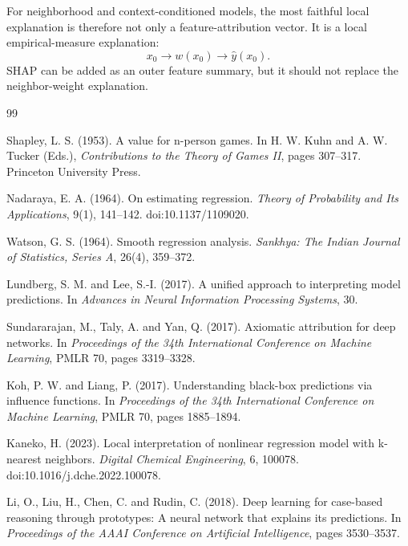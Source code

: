\documentclass[11pt]{article}
\newcommand{\1}{\mathbf{1}}
\begin{document}
For neighborhood and context-conditioned models, the most faithful local explanation is therefore not only a feature-attribution vector. It is a local empirical-measure explanation:
\[
x_0 \rightarrow w(x_0) \rightarrow \hat y(x_0).
\]
SHAP can be added as an outer feature summary, but it should not replace the neighbor-weight explanation.

\begin{thebibliography}{99}

Shapley, L. S. (1953).
\newblock A value for n-person games.
\newblock In H. W. Kuhn and A. W. Tucker (Eds.), \emph{Contributions to the Theory of Games II}, pages 307--317. Princeton University Press.

Nadaraya, E. A. (1964).
\newblock On estimating regression.
\newblock \emph{Theory of Probability and Its Applications}, 9(1), 141--142.
\newblock doi:10.1137/1109020.

Watson, G. S. (1964).
\newblock Smooth regression analysis.
\newblock \emph{Sankhya: The Indian Journal of Statistics, Series A}, 26(4), 359--372.

Lundberg, S. M. and Lee, S.-I. (2017).
\newblock A unified approach to interpreting model predictions.
\newblock In \emph{Advances in Neural Information Processing Systems}, 30.

Sundararajan, M., Taly, A. and Yan, Q. (2017).
\newblock Axiomatic attribution for deep networks.
\newblock In \emph{Proceedings of the 34th International Conference on Machine Learning}, PMLR 70, pages 3319--3328.

Koh, P. W. and Liang, P. (2017).
\newblock Understanding black-box predictions via influence functions.
\newblock In \emph{Proceedings of the 34th International Conference on Machine Learning}, PMLR 70, pages 1885--1894.

Kaneko, H. (2023).
\newblock Local interpretation of nonlinear regression model with k-nearest neighbors.
\newblock \emph{Digital Chemical Engineering}, 6, 100078.
\newblock doi:10.1016/j.dche.2022.100078.

Li, O., Liu, H., Chen, C. and Rudin, C. (2018).
\newblock Deep learning for case-based reasoning through prototypes: A neural network that explains its predictions.
\newblock In \emph{Proceedings of the AAAI Conference on Artificial Intelligence}, pages 3530--3537.


\end{thebibliography}
\end{document}
